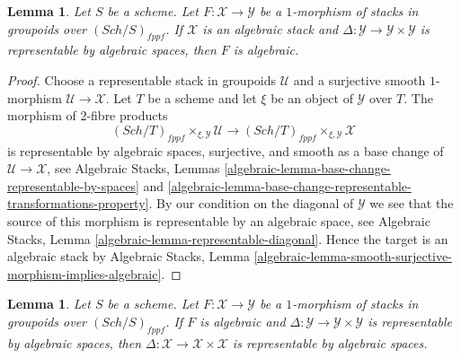 \documentclass{stacks-project}
\theoremstyle{plain}
\newtheorem{lemma}[subsection]{Lemma}
\theoremstyle{definition}
\theoremstyle{remark}
\numberwithin{equation}{subsection}
\def\Sch{\mathit{Sch}}
\begin{document}
\begin{lemma}
\label{lemma-map-from-algebraic}
Let $S$ be a scheme. Let $F : \mathcal{X} \to \mathcal{Y}$ be a $1$-morphism
of stacks in groupoids over $(\Sch/S)_{fppf}$. If $\mathcal{X}$ is an
algebraic stack and $\Delta : \mathcal{Y} \to \mathcal{Y} \times \mathcal{Y}$
is representable by algebraic spaces, then $F$ is algebraic.
\end{lemma}

\begin{proof}
Choose a representable stack in groupoids $\mathcal{U}$ and a surjective
smooth $1$-morphism $\mathcal{U} \to \mathcal{X}$. Let $T$ be a scheme and
let $\xi$ be an object of $\mathcal{Y}$ over $T$. The morphism of
$2$-fibre products
$$
(\Sch/T)_{fppf} \times_{\xi, \mathcal{Y}} \mathcal{U}
\longrightarrow
(\Sch/T)_{fppf} \times_{\xi, \mathcal{Y}} \mathcal{X}
$$
is representable by algebraic spaces, surjective, and smooth as a
base change of $\mathcal{U} \to \mathcal{X}$, see
Algebraic Stacks,
Lemmas \ref{algebraic-lemma-base-change-representable-by-spaces} and
\ref{algebraic-lemma-base-change-representable-transformations-property}.
By our condition on the diagonal of $\mathcal{Y}$ we see that
the source of this morphism is representable by an algebraic space, see
Algebraic Stacks, Lemma \ref{algebraic-lemma-representable-diagonal}.
Hence the target is an algebraic stack by
Algebraic Stacks,
Lemma \ref{algebraic-lemma-smooth-surjective-morphism-implies-algebraic}.
\end{proof}

\begin{lemma}
\label{lemma-diagonals-and-algebraic-morphisms}
Let $S$ be a scheme. Let $F : \mathcal{X} \to \mathcal{Y}$ be a $1$-morphism
of stacks in groupoids over $(\Sch/S)_{fppf}$.
If $F$ is algebraic and
$\Delta : \mathcal{Y} \to \mathcal{Y} \times \mathcal{Y}$
is representable by algebraic spaces, then
$\Delta : \mathcal{X} \to \mathcal{X} \times \mathcal{X}$
is representable by algebraic spaces.
\end{lemma}
\end{document}
